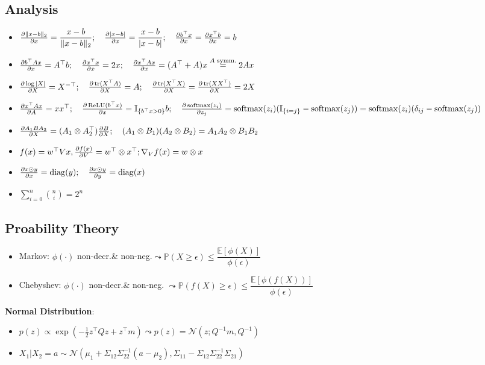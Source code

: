 \subsection{Analysis}
\begin{itemize}
    \item $\frac{\partial \|x-b\|_2}{\partial x}=\dfrac{x-b}{\|x-b\|_2}; \quad \frac{\partial |x-b|}{\partial x}=\dfrac{x-b}{|x-b|}; \quad \frac{\partial b^{\top} x}{\partial x}=\frac{\partial x^{\top} b}{\partial x} = b$
    \item $\frac{\partial b^{\top}Ax}{\partial x}=A^{\top}b; \quad \frac{\partial x^{\top}x}{\partial x} = 2x; \quad \frac{\partial x^{\top}Ax}{\partial x}=(A^{\top}+A)x \stackrel{A \text{ symm.}}{=} 2Ax$
    \item $\frac{\partial \log |X|}{\partial X} = X^{-\top}; \quad \frac{\partial \operatorname{tr}(X^{\top}A)}{\partial X}=A; \quad \frac{\partial \operatorname{tr}(X^{\top}X)}{\partial X}=\frac{\partial \operatorname{tr}(X X^{\top})}{\partial X}=2X$
    \item $\frac{\partial x^{\top}Ax}{\partial A}=xx^{\top}; \quad \frac{\partial \operatorname{ReLU}(b^{\top}x)}{\partial x}=\mathbb{I}_{\{b^{\top}x>0\}} b; \quad \frac{\partial \operatorname{softmax}(z_i)}{\partial z_j}=\operatorname{softmax}(z_i)(\mathbb{I}_{\{i=j\}}- \operatorname{softmax}(z_j))=\operatorname{softmax}(z_i)(\delta_{ij}- \operatorname{softmax}(z_j))$
    \item $\frac{\partial A_1 B A_2}{\partial X}=(A_1 \otimes A_2^\top)\frac{\partial B}{\partial X}; \quad (A_1\otimes B_1)(A_2\otimes B_2)=A_1A_2 \otimes B_1B_2$
    \item $f(x)=w^\top V x, \frac{\partial f(x)}{\partial V}=w^\top \otimes x^\top; \nabla_V f(x) = w\otimes x$
    \item $\frac{\partial x \odot y}{\partial x} = \operatorname{diag}(y); \quad \frac{\partial x \odot y}{\partial y} = \operatorname{diag}(x)$
    \item $\sum_{i = 0}^n {n \choose i} = 2^n$ 
\end{itemize}

\subsection{Proability Theory}
\begin{itemize}
    \item Markov: $\phi(\cdot)$ non-decr.\& non-neg.$\leadsto\mathbb{P}(X \geq \epsilon)\leq \dfrac{\mathbb{E}[\phi(X)]}{\phi(\epsilon)}$
    \item Chebyshev: $\phi(\cdot)$ non-decr.\& non-neg. $\leadsto \mathbb{P}(f(X)\geq \epsilon)\leq \dfrac{\mathbb{E}[\phi(f(X))]}{\phi(\epsilon)}$
\end{itemize}

\textbf{Normal Distribution}:
\begin{itemize}
    \item $p(z)\propto \exp\left(-\frac{1}{2} z^{\top}Qz + z^{\top} m\right)\leadsto p(z)=\mathcal{N}(z; Q^{-1}m, Q^{-1})$
    \item $X_1|X_2 = a \sim \mathcal{N}(\mu_1 + \Sigma_{12} \Sigma_{22}^{-1} (a-\mu_2), \Sigma_{11} - \Sigma_{12}\Sigma_{22}^{-1} \Sigma_{21})$
\end{itemize}

